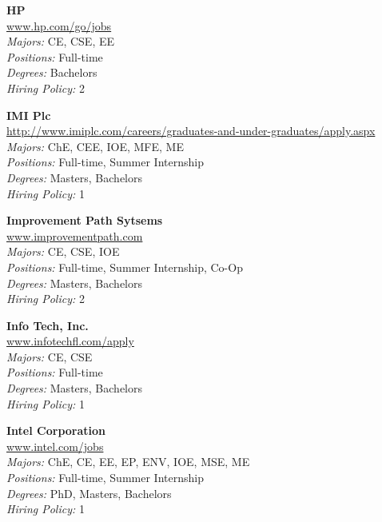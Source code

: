 \documentclass[twoside]{article}
\begin{document}
\begin{center}
\begin{multicols}{3}
\begin{minipage}{.9\columnwidth}{\Large\bf HP }\\
	\url{www.hp.com/go/jobs}\\
	\emph{Majors:} CE, CSE, EE\\
	\emph{Positions:} Full-time\\
	\emph{Degrees:} Bachelors\\
	\emph{Hiring Policy:} 2\\
\end{minipage}
 
\begin{minipage}{.9\columnwidth}{\Large\bf IMI Plc }\\
	\url{http://www.imiplc.com/careers/graduates-and-under-graduates/apply.aspx}\\
	\emph{Majors:} ChE, CEE, IOE, MFE, ME\\
	\emph{Positions:} Full-time, Summer Internship\\
	\emph{Degrees:} Masters, Bachelors\\
	\emph{Hiring Policy:} 1\\
\end{minipage}
 
\begin{minipage}{.9\columnwidth}{\Large\bf Improvement Path Sytsems }\\
	\url{www.improvementpath.com}\\
	\emph{Majors:} CE, CSE, IOE\\
	\emph{Positions:} Full-time, Summer Internship, Co-Op\\
	\emph{Degrees:} Masters, Bachelors\\
	\emph{Hiring Policy:} 2\\
\end{minipage}
 
\begin{minipage}{.9\columnwidth}{\Large\bf Info Tech, Inc. }\\
	\url{www.infotechfl.com/apply}\\
	\emph{Majors:} CE, CSE\\
	\emph{Positions:} Full-time\\
	\emph{Degrees:} Masters, Bachelors\\
	\emph{Hiring Policy:} 1\\
\end{minipage}
 
\begin{minipage}{.9\columnwidth}{\Large\bf Intel Corporation }\\
	\url{www.intel.com/jobs}\\
	\emph{Majors:} ChE, CE, EE, EP, ENV, IOE, MSE, ME\\
	\emph{Positions:} Full-time, Summer Internship\\
	\emph{Degrees:} PhD, Masters, Bachelors\\
	\emph{Hiring Policy:} 1\\
\end{minipage}
 

\end{multicols}
\end{center}
\end{document}
